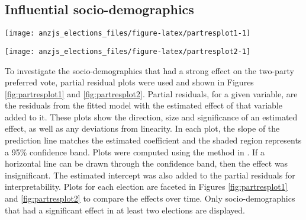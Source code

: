 \documentclass[
  times, doublespace]{anzsauth}
\let\origfigure\figure
\let\endorigfigure\endfigure
\renewenvironment{figure}[1][2] {
    \expandafter\origfigure\expandafter[htbp]
} {
    \endorigfigure
}
\begin{document}
\hypertarget{influential-socio-demographics}{%
\subsection{Influential socio-demographics}\label{influential-socio-demographics}}



\begin{figure}[h]

{\centering \texttt{[image: anzjs\_elections\_files/figure-latex/partresplot1-1]} 

}

\caption{Partial residual plots by election year for a selection of predictors. Linear model with 95\% confidence bands overlaid. Most predictors had a positive relationship: the larger the value the more likely the electorate preferenced Liberal. The relationships were relatively robust over time, with the exception of \texttt{DiffAddress}, \texttt{Incomes}, \texttt{OtherLanguageHome} and \texttt{Pop\_00\_19}.}\label{fig:partresplot1}
\end{figure}



\begin{figure}[h]

{\centering \texttt{[image: anzjs\_elections\_files/figure-latex/partresplot2-1]} 

}

\caption{Partial residual plots by election year for a selection of predictors. Linear model with 95\% confidence bands overlaid. Several predictors had a negative relationship: with larger values indicating the electorate more likely preferenced Labor. Most relationships were relatively stable over elections, except \texttt{Unemployment} and \texttt{Education}.}\label{fig:partresplot2}
\end{figure}

To investigate the socio-demographics that had a strong effect on the two-party preferred vote, partial residual plots were used and shown in Figures \ref{fig:partresplot1} and \ref{fig:partresplot2}. Partial residuals, for a given variable, are the residuals from the fitted model with the estimated effect of that variable added to it. These plots show the direction, size and significance of an estimated effect, as well as any deviations from linearity. In each plot, the slope of the prediction line matches the estimated coefficient and the shaded region represents a 95\% confidence band. Plots were computed using the method in \citet{visreg}. If a horizontal line can be drawn through the confidence band, then the effect was insignificant. The estimated intercept was also added to the partial residuals for interpretability. Plots for each election are faceted in Figures \ref{fig:partresplot1} and \ref{fig:partresplot2} to compare the effects over time. Only socio-demographics that had a significant effect in at least two elections are displayed.
\end{document}
